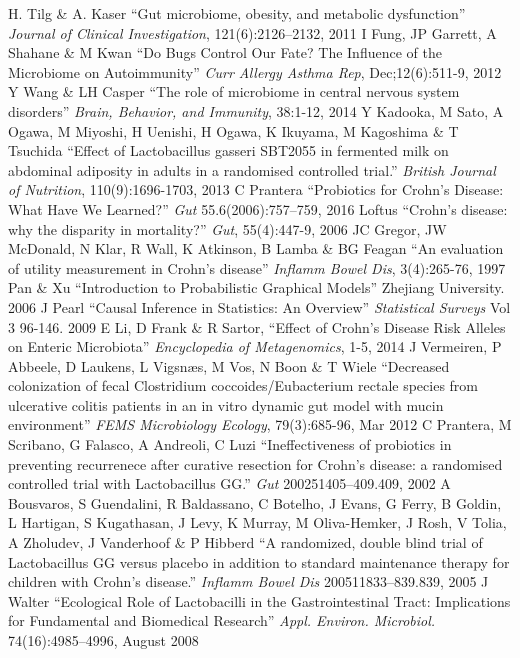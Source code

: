 \documentclass[a4paper]{article}
\begin{document}
\begin{thebibliography}{11}
 H. Tilg \& A. Kaser ``Gut microbiome, obesity, and metabolic
  dysfunction'' \textit{Journal of Clinical Investigation}, 121(6):2126–2132, 2011 
 I Fung, JP Garrett, A Shahane \& M Kwan ``Do Bugs Control Our
  Fate? The Influence of the Microbiome on Autoimmunity'' \textit{Curr Allergy
  Asthma Rep}, Dec;12(6):511-9, 2012
 Y Wang \& LH Casper ``The role of microbiome in central
  nervous system disorders'' \textit{Brain, Behavior, and Immunity}, 38:1-12, 2014
 Y Kadooka,  M Sato,  A Ogawa,  M Miyoshi,  H Uenishi,
  H Ogawa, K Ikuyama, M Kagoshima  \& T Tsuchida  ``Effect of Lactobacillus gasseri SBT2055
  in fermented milk on abdominal adiposity in adults in a randomised
  controlled trial.'' \textit{British Journal of Nutrition}, 110(9):1696-1703, 2013
 C Prantera ``Probiotics for Crohn’s Disease: What
  Have We Learned?'' \textit{Gut} 55.6(2006):757–759, 2016
 Loftus ``Crohn’s disease: why the disparity in
  mortality?'' \textit{Gut}, 55(4):447-9, 2006
  JC Gregor,  JW McDonald,  N Klar,  R Wall,  K Atkinson,
 B  Lamba \& BG Feagan  ``An evaluation of utility measurement in
 Crohn's disease'' \textit{Inflamm Bowel Dis}, 3(4):265-76, 1997
 Pan \& Xu ``Introduction to Probabilistic
  Graphical Models'' Zhejiang University. 2006
 J Pearl ``Causal Inference in Statistics: An
  Overview'' \textit{Statistical Surveys} Vol 3 96-146. 2009
 E Li, D Frank \& R Sartor, ``Effect of Crohn’s Disease Risk
  Alleles on Enteric Microbiota'' \textit{Encyclopedia of
    Metagenomics},  1-5, 2014
 J Vermeiren, P Abbeele, D Laukens,
  L Vigsnæs, M Vos, N Boon \& T
  Wiele ``Decreased colonization of fecal Clostridium
  coccoides/Eubacterium rectale species from ulcerative colitis
  patients in an in vitro dynamic gut model with mucin environment''
  \textit{FEMS Microbiology Ecology},  79(3):685-96, Mar 2012
 C Prantera, M Scribano, G Falasco, A Andreoli, C Luzi
  ``Ineffectiveness of probiotics in preventing recurrenece after
  curative resection for Crohn's disease: a randomised controlled
  trial with Lactobacillus GG.'' \textit{Gut}  200251405–409.409, 2002
 A Bousvaros,  S Guendalini,  R Baldassano, C Botelho,
  J Evans,  G Ferry,  B Goldin,  L Hartigan,  S Kugathasan,  J Levy,
  K Murray,  M Oliva-Hemker,  J Rosh, V Tolia,  A Zholudev,  J
  Vanderhoof \&  P Hibberd ``A randomized, double blind trial of
  Lactobacillus GG versus placebo in addition to standard maintenance
  therapy for children with Crohn's disease.'' \textit{Inflamm Bowel
    Dis} 200511833–839.839, 2005
 J Walter ``Ecological Role of Lactobacilli in the
  Gastrointestinal Tract: Implications for Fundamental and Biomedical
  Research'' \textit{Appl. Environ. Microbiol.} 74(16):4985–4996, August 2008

    

\end{thebibliography}
\end{document}
